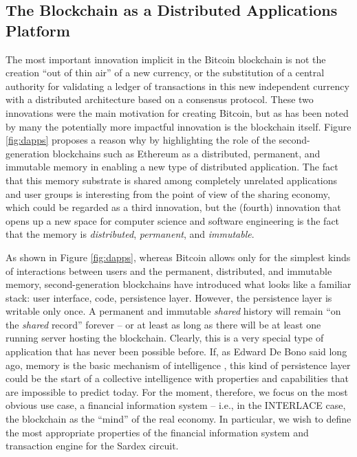 \subsection{The Blockchain as a Distributed Applications Platform}
The most important innovation implicit in the Bitcoin blockchain is not the creation ``out of thin air'' of a new currency, or the substitution of a central authority for validating a ledger of transactions in this new independent currency with a distributed architecture based on a consensus protocol. These two innovations were the main motivation for creating Bitcoin, but as has been noted by many the potentially more impactful innovation is the blockchain itself. Figure \ref{fig:dapps} proposes a reason why by highlighting the role of the second-generation blockchains such as Ethereum as a distributed, permanent, and immutable memory in enabling a new type of distributed application. The fact that this memory substrate is shared among completely unrelated applications and user groups is interesting from the point of view of the sharing economy, which could be regarded as a third innovation, but the (fourth) innovation that opens up a new space for computer science and software engineering is the fact that the memory is \emph{distributed}, \emph{permanent}, and \emph{immutable}.

As shown in Figure \ref{fig:dapps}, whereas Bitcoin allows only for the simplest kinds of interactions between users and the permanent, distributed, and immutable memory, second-generation blockchains have introduced what looks like a familiar stack: user interface, code, persistence layer. However, the persistence layer is writable only once. A permanent and immutable \emph{shared} history will remain ``on the \emph{shared} record'' forever -- or at least as long as there will be at least one running server hosting the blockchain. Clearly, this is a very special type of application that has never been possible before. If, as Edward De Bono said long ago, memory is the basic mechanism of intelligence \cite{DeBono1969}, this kind of persistence layer could be the start of a collective intelligence with properties and capabilities that are impossible to predict today. For the moment, therefore, we focus on the most obvious use case, a financial information system -- i.e., in the INTERLACE case, the blockchain as the ``mind'' of the real economy. In particular, we wish to define the most appropriate properties of the financial information system and transaction engine for the Sardex circuit.

